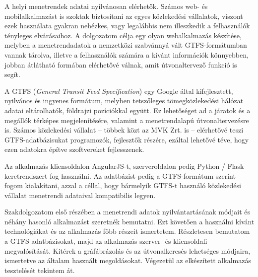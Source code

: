 
A helyi menetrendek adatai nyilvánosan elérhetők. Számos web- és mobilalkalmazást is szoktak biztosítani az egyes közlekedési vállalatok, viszont ezek használata gyakran nehézkes, vagy legalábbis nem illeszkedik a felhasználók tényleges elvárásaihoz. A dolgozatom célja egy olyan webalkalmazás készítése, melyben a menetrendadatok a nemzetközi szabvánnyá vált GTFS-formátumban vannak tárolva, illetve a felhasználók számára a kívánt információk könnyebben, jobban átlátható formában elérhetővé válnak, amit útvonaltervező funkció is segít.

A GTFS (\textit{General Transit Feed Specification}) egy Google által kifejlesztett, nyilvános és ingyenes formátum, melyben tetszőleges tömegközlekedési hálózat adatai eltárolhatók, földrajzi pozíciókkal együtt. Ez lehetőséget ad a járatok és a megállók térképes megjelenítésére, valamint a menetrendalapú útvonaltervezésre is. Számos közlekedési vállalat – többek közt az MVK Zrt. is – elérhetővé teszi GTFS-adatbázisukat programozók, fejlesztők részére, ezáltal lehetővé téve, hogy ezen adatokra építve szoftvereket fejlesszenek.

Az alkalmazás kliensoldalon AngularJS-t, szerveroldalon pedig Python / Flask keretrendszert fog használni. Az adatbázist pedig a GTFS-formátum szerint fogom kialakítani, azzal a céllal, hogy bármelyik GTFS-t használó közlekedési vállalat menetrendi adataival kompatibilis legyen.

Szakdolgozatom első részében a menetrendi adatok nyilvántartásának módjait és néhány hasonló alkalmazást szeretnék bemutatni. Ezt követően a használni kívánt technológiákat és az alkalmazás főbb részeit ismertetem. Részletesen bemutatom a GTFS-adatbázisokat, majd az alkalmazás szerver- és kliensoldali megvalósítását. Kitérek a gráfábrázolás és az útvonalkeresés lehetséges módjaira, ismertetve az általam használt megoldásokat. Végezetül az elkészített alkalmazás tesztelését tekintem át.
